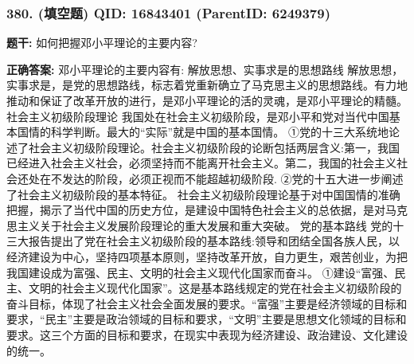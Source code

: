 \documentclass[12pt,UTF8]{ctexart}
\begin{document}
\vspace{0.3em}\hrulefill\vspace{0.7em}

\subsubsection*{380. (填空题) \small QID: 16843401 (ParentID: 6249379)}

\textbf{题干:}
如何把握邓小平理论的主要内容?



\textbf{正确答案:}
邓小平理论的主要内容有:
解放思想、实事求是的思想路线
解放思想，实事求是，是党的思想路线，标志着党重新确立了马克思主义的思想路线。有力地推动和保证了改革开放的进行，是邓小平理论的活的灵魂，是邓小平理论的精髓。
社会主义初级阶段理论
我国处在社会主义初级阶段，是邓小平和党对当代中国基本国情的科学判断。最大的“实际”就是中国的基本国情。
①党的十三大系统地论述了社会主义初级阶段理论。社会主义初级阶段的论断包括两层含义:第一，我国已经进入社会主义社会，必须坚持而不能离开社会主义。第二，我国的社会主义社会还处在不发达的阶段，必须正视而不能超越初级阶段.
②党的十五大进一步阐述了社会主义初级阶段的基本特征。
社会主义初级阶段理论基于对中国国情的准确把握，揭示了当代中国的历史方位，是建设中国特色社会主义的总依据，是对马克思主义关于社会主义发展阶段理论的重大发展和重大突破。
党的基本路线
党的十三大报告提出了党在社会主义初级阶段的基本路线:领导和团结全国各族人民，以经济建设为中心，坚持四项基本原则，坚持改革开放，自力更生，艰苦创业，为把我国建设成为富强、民主、文明的社会主义现代化国家而奋斗。
①建设“富强、民主、文明的社会主义现代化国家”。这是基本路线规定的党在社会主义初级阶段的奋斗目标，体现了社会主义社会全面发展的要求。“富强”主要是经济领域的目标和要求，“民主”主要是政治领域的目标和要求，“文明”主要是思想文化领域的目标和要求。这三个方面的目标和要求，在现实中表现为经济建设、政治建设、文化建设的统一。
\end{document}

